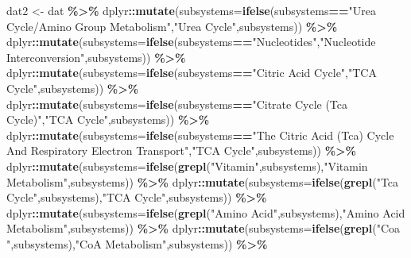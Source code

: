 \documentclass[
]{book}
\newenvironment{Shaded}{\begin{snugshade}}{\end{snugshade}}
\newcommand{\AttributeTok}[1]{\textcolor[rgb]{0.13,0.29,0.53}{#1}}
\newcommand{\FunctionTok}[1]{\textcolor[rgb]{0.13,0.29,0.53}{\textbf{#1}}}
\newcommand{\NormalTok}[1]{#1}
\newcommand{\OtherTok}[1]{\textcolor[rgb]{0.56,0.35,0.01}{#1}}
\newcommand{\SpecialCharTok}[1]{\textcolor[rgb]{0.81,0.36,0.00}{\textbf{#1}}}
\newcommand{\StringTok}[1]{\textcolor[rgb]{0.31,0.60,0.02}{#1}}
\begin{document}
\begin{Shaded}
\begin{Highlighting}[]
\NormalTok{dat2 }\OtherTok{\textless{}{-}}\NormalTok{ dat }\SpecialCharTok{\%\textgreater{}\%}
\NormalTok{  dplyr}\SpecialCharTok{::}\FunctionTok{mutate}\NormalTok{(}\AttributeTok{subsystems=}\FunctionTok{ifelse}\NormalTok{(subsystems}\SpecialCharTok{==}\StringTok{"Urea Cycle/Amino Group Metabolism"}\NormalTok{,}\StringTok{"Urea Cycle"}\NormalTok{,subsystems)) }\SpecialCharTok{\%\textgreater{}\%}
\NormalTok{  dplyr}\SpecialCharTok{::}\FunctionTok{mutate}\NormalTok{(}\AttributeTok{subsystems=}\FunctionTok{ifelse}\NormalTok{(subsystems}\SpecialCharTok{==}\StringTok{"Nucleotides"}\NormalTok{,}\StringTok{"Nucleotide Interconversion"}\NormalTok{,subsystems)) }\SpecialCharTok{\%\textgreater{}\%}
\NormalTok{  dplyr}\SpecialCharTok{::}\FunctionTok{mutate}\NormalTok{(}\AttributeTok{subsystems=}\FunctionTok{ifelse}\NormalTok{(subsystems}\SpecialCharTok{==}\StringTok{"Citric Acid Cycle"}\NormalTok{,}\StringTok{"TCA Cycle"}\NormalTok{,subsystems)) }\SpecialCharTok{\%\textgreater{}\%}
\NormalTok{  dplyr}\SpecialCharTok{::}\FunctionTok{mutate}\NormalTok{(}\AttributeTok{subsystems=}\FunctionTok{ifelse}\NormalTok{(subsystems}\SpecialCharTok{==}\StringTok{"Citrate Cycle (Tca Cycle)"}\NormalTok{,}\StringTok{"TCA Cycle"}\NormalTok{,subsystems)) }\SpecialCharTok{\%\textgreater{}\%}
\NormalTok{  dplyr}\SpecialCharTok{::}\FunctionTok{mutate}\NormalTok{(}\AttributeTok{subsystems=}\FunctionTok{ifelse}\NormalTok{(subsystems}\SpecialCharTok{==}\StringTok{"The Citric Acid (Tca) Cycle And Respiratory Electron Transport"}\NormalTok{,}\StringTok{"TCA Cycle"}\NormalTok{,subsystems)) }\SpecialCharTok{\%\textgreater{}\%}
\NormalTok{  dplyr}\SpecialCharTok{::}\FunctionTok{mutate}\NormalTok{(}\AttributeTok{subsystems=}\FunctionTok{ifelse}\NormalTok{(}\FunctionTok{grepl}\NormalTok{(}\StringTok{"Vitamin"}\NormalTok{,subsystems),}\StringTok{"Vitamin Metabolism"}\NormalTok{,subsystems)) }\SpecialCharTok{\%\textgreater{}\%}
\NormalTok{  dplyr}\SpecialCharTok{::}\FunctionTok{mutate}\NormalTok{(}\AttributeTok{subsystems=}\FunctionTok{ifelse}\NormalTok{(}\FunctionTok{grepl}\NormalTok{(}\StringTok{"Tca Cycle"}\NormalTok{,subsystems),}\StringTok{"TCA Cycle"}\NormalTok{,subsystems)) }\SpecialCharTok{\%\textgreater{}\%}
\NormalTok{  dplyr}\SpecialCharTok{::}\FunctionTok{mutate}\NormalTok{(}\AttributeTok{subsystems=}\FunctionTok{ifelse}\NormalTok{(}\FunctionTok{grepl}\NormalTok{(}\StringTok{"Amino Acid"}\NormalTok{,subsystems),}\StringTok{"Amino Acid Metabolism"}\NormalTok{,subsystems)) }\SpecialCharTok{\%\textgreater{}\%}
\NormalTok{  dplyr}\SpecialCharTok{::}\FunctionTok{mutate}\NormalTok{(}\AttributeTok{subsystems=}\FunctionTok{ifelse}\NormalTok{(}\FunctionTok{grepl}\NormalTok{(}\StringTok{"Coa "}\NormalTok{,subsystems),}\StringTok{"CoA Metabolism"}\NormalTok{,subsystems)) }\SpecialCharTok{\%\textgreater{}\%}

\end{Highlighting}
\end{Shaded}
\end{document}
